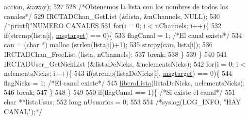 \begin{DoxyCode}
{{{{{{{{{      \hyperlink{_g-2361-06-_p1-_server_8c_a93e785c991445d8b8ee99c2e51242d5a}{accion}, &\hyperlink{_g-2361-06-_p1-_server_8c_adf86742e21384f58f8999d8317e6a370}{away});
527 
528                                 \textcolor{comment}{/*Obtenemos la lista con los nombres de todos los canales*/}
529                                 IRCTADChan\_GetList (&lista, &nChannels, NULL);
530                                 \textcolor{comment}{/*printf("NUMERO CANALES %
531                                 \textcolor{keywordflow}{for}(i = 0; i < nChannels; i++)\{
532                                         \textcolor{keywordflow}{if}(strcmp(lista[i], \hyperlink{_g-2361-06-_p1-_server_8c_a968dcc7e43caeca7959f3c069dcccc6a}{msgtarget}) == 0)\{
533                                                 flagCanal = 1; \textcolor{comment}{/*El canal existe*/}
534                                                 can = (\textcolor{keywordtype}{char} *) malloc (strlen(lista[i])+1);
535                                                 strcpy(can, lista[i]);
536                                                 IRCTADChan\_FreeList (lista, nChannels);
537                                                 \textcolor{keywordflow}{break};
538                                         \}
539                                 \}
540                                 
541                                 IRCTADUser\_GetNickList (&listaDeNicks, &nelementsNicks);
542                                 \textcolor{keywordflow}{for}(i = 0; i < nelementsNicks; i++)\{
543                                         \textcolor{keywordflow}{if}(strcmp(listaDeNicks[i], \hyperlink{_g-2361-06-_p1-_server_8c_a968dcc7e43caeca7959f3c069dcccc6a}{msgtarget}) == 0)\{
544                                                 flagNicks = 1; \textcolor{comment}{/*El canal existe*/}
545                                                 \hyperlink{_g-2361-06-_p1-_functions_8h_a5fa63429b3483f20a469c23625c96820}{liberaLista}(listaDeNicks, nelementsNicks);
546                                                 \textcolor{keywordflow}{break};
547                                         \}
548                                 \}
549                                 
550                                 \textcolor{keywordflow}{if}(flagCanal == 1)\{ \textcolor{comment}{/*Si existe el canal*/}
551                                         \textcolor{keywordtype}{char} **listaUsus;
552                                         \textcolor{keywordtype}{long} nUsuarios = 0;
553 
554                                         \textcolor{comment}{/*syslog(LOG\_INFO, "HAY CANAL");*/}
}}}}}}}}}}
\end{DoxyCode}
